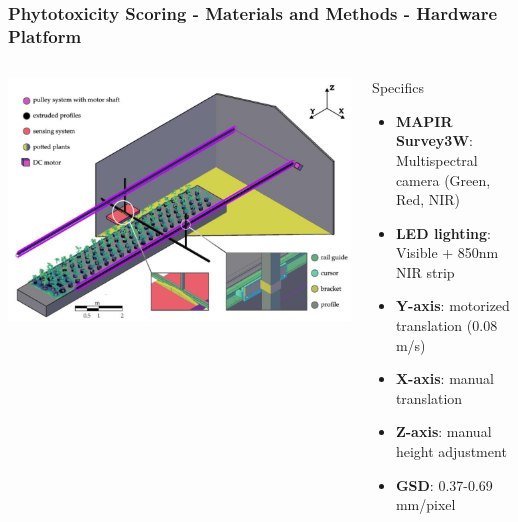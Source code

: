 \documentclass[aspectratio=43]{beamer}
\begin{document}
\begin{frame}
    \frametitle{\small Phytotoxicity Scoring - Materials and Methods - Hardware Platform}
    
    \begin{columns}
        \begin{column}{0.7\textwidth}
            \includegraphics[width=\textwidth]{Imgs/agronomy-14-00306-g001.png}
        \end{column}
        
        \begin{column}{0.3\textwidth}
            \begin{block}{Specifics}
                \scriptsize
                \begin{itemize}
                    \item \textbf{MAPIR Survey3W}: Multispectral camera (Green, Red, NIR)
                    \item \textbf{LED lighting}: Visible + 850nm NIR strip
                    \item \textbf{Y-axis}: motorized translation (0.08 m/s)
                    \item \textbf{X-axis}: manual translation
                    \item \textbf{Z-axis}: manual height adjustment
                    \item \textbf{GSD}: 0.37-0.69 mm/pixel
                \end{itemize}
            \end{block}
        \end{column}
    \end{columns}
\end{frame}
\end{document}
